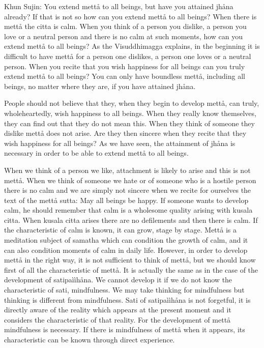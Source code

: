 \documentclass[12pt,twoside]{article}
\begin{document}
Khun Sujin: You extend mett{\aa} to all beings, but have you attained
jh{\aa}na already? If that is not so how can you extend mett{\aa} to
all beings? When there is mett{\aa} the citta is calm. When you think
of a person you dislike, a person you love or a neutral person and
there is no calm at such moments, how can you extend mett{\aa} to all
beings? As the Visuddhimagga explains, in the beginning it is difficult
to have mett{\aa} for a person one dislikes, a person one loves or a
neutral person. When you recite that you wish happiness for all beings
can you truly extend mett{\aa} to all beings? You can only have
boundless mett{\aa}, including all beings, no matter where they are, if
you have attained jh{\aa}na. 

People should not believe that they, when they begin to develop
mett{\aa}, can truly, wholeheartedly, wish happiness to all beings.
When they really know themselves, they can find out that they do not
mean this. When they think of someone they dislike mett{\aa} does not
arise. Are they then sincere when they recite that they wish happiness
for all beings? As we have seen, the attainment of jh{\aa}na is
necessary in order to be able to extend mett{\aa} to all beings. 

When we think of a person we like, attachment is likely to arise and
this is not mett{\aa}. When we think of someone we hate or of someone
who is a hostile person there is no calm and we are simply not sincere
when we recite for ourselves the text of the mett{\aa} sutta:
{\textasciigrave}{\textasciigrave}May all beings be
happy{\textquotesingle}{\textquotesingle}. If someone wants to develop
calm, he should remember that calm is a wholesome quality arising with
kusala citta. When kusala citta arises there are no defilements and
then there is calm. If the characteristic of calm is known, it can
grow, stage by stage. Mett{\aa} is a meditation subject of samatha
which can condition the growth of calm, and it can also condition
moments of calm in daily life. However, in order to develop mett{\aa}
in the right way, it is not sufficient to think of mett{\aa}, but we
should know first of all the characteristic of mett{\aa}. It is
actually the same as in the case of the development of
satipa\`i\`ih{\aa}na. We cannot develop it if we do not know the
characteristic of sati, mindfulness. We may take thinking for
mindfulness but thinking is different from mindfulness. Sati of
satipa\`i\`ih{\aa}na is not forgetful, it is directly aware of the
reality which appears at the present moment and it considers the
characteristic of that reality. For the development of mett{\aa}
mindfulness is necessary. If there is mindfulness of mett{\aa} when it
appears, its characteristic can be known through direct experience. 
\end{document}
